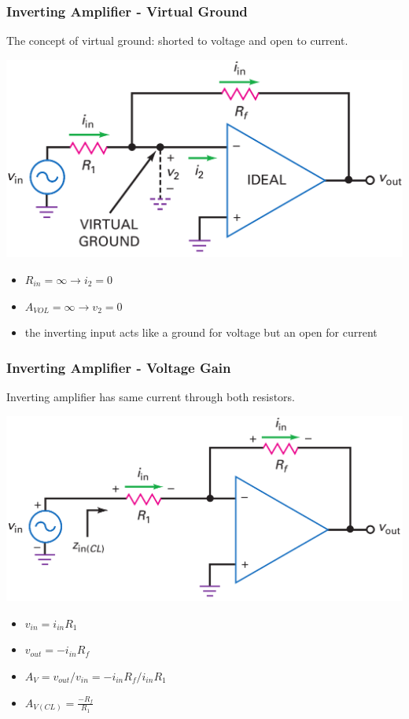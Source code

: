 \documentclass[pdflatex,compress]{beamer}
\begin{document}
\begin{frame}
	\frametitle{Inverting Amplifier - Virtual Ground}
	The concept of virtual ground: shorted to voltage and open to current.
	\begin{multicols}{2}
		\begin{center}
			\includegraphics[width=\linewidth]{img/fig1613}
		\end{center}
		\columnbreak
		\begin{itemize}
			\item $R_{in} = \infty \rightarrow i_2 = 0$
			\item $A_{VOL} = \infty \rightarrow v_2 = 0$
			\item the inverting input acts like a ground for voltage but an open for current
		\end{itemize}
	\end{multicols}
\end{frame}

\begin{frame}
	\frametitle{Inverting Amplifier - Voltage Gain}
	Inverting ampliﬁer has same current through both resistors.
	\begin{multicols}{2}
		\begin{center}
			\includegraphics[width=\linewidth]{img/fig1614}
		\end{center}
		\columnbreak
		\begin{itemize}
			\item $v_{in} = i_{in} R_1$
			\item $v_{out} = -i_{in} R_f$
			\item $A_V = v_{out} / v_{in} = -i_{in} R_f / i_{in} R_1$
			\item $A_{V(CL)} = \frac{-R_f}{R_1}$
		\end{itemize}
	\end{multicols}
	
\end{frame}
\end{document}
